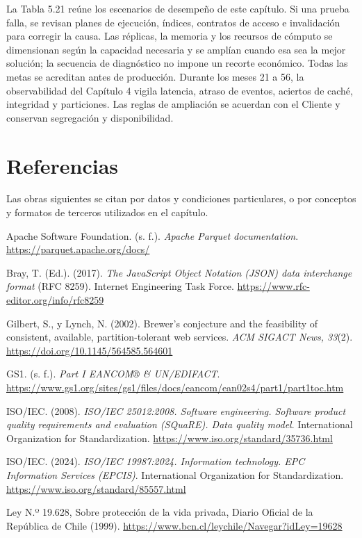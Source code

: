 \documentclass[11pt]{article}
\begin{document}
La Tabla 5.21 reúne los escenarios de desempeño de este capítulo. Si una prueba falla, se revisan planes de ejecución, índices, contratos de acceso e invalidación para corregir la causa. Las réplicas, la memoria y los recursos de cómputo se dimensionan según la capacidad necesaria y se amplían cuando esa sea la mejor solución; la secuencia de diagnóstico no impone un recorte económico. Todas las metas se acreditan antes de producción. Durante los meses 21 a 56, la observabilidad del Capítulo 4 vigila latencia, atraso de eventos, aciertos de caché, integridad y particiones. Las reglas de ampliación se acuerdan con el Cliente y conservan segregación y disponibilidad.


\section*{Referencias}

Las obras siguientes se citan por datos y condiciones particulares, o por conceptos y formatos de terceros utilizados en el capítulo.

Apache Software Foundation. (s. f.). \textit{Apache Parquet documentation}. \url{https://parquet.apache.org/docs/}

Bray, T. (Ed.). (2017). \textit{The JavaScript Object Notation (JSON) data interchange format} (RFC 8259). Internet Engineering Task Force. \url{https://www.rfc-editor.org/info/rfc8259}


Gilbert, S., y Lynch, N. (2002). Brewer's conjecture and the feasibility of consistent, available, partition-tolerant web services. \textit{ACM SIGACT News, 33}(2). \url{https://doi.org/10.1145/564585.564601}

GS1. (s. f.). \textit{Part I EANCOM® \& UN/EDIFACT}. \url{https://www.gs1.org/sites/gs1/files/docs/eancom/ean02s4/part1/part1toc.htm}

ISO/IEC. (2008). \textit{ISO/IEC 25012:2008. Software engineering. Software product quality requirements and evaluation (SQuaRE). Data quality model}. International Organization for Standardization. \url{https://www.iso.org/standard/35736.html}

ISO/IEC. (2024). \textit{ISO/IEC 19987:2024. Information technology. EPC Information Services (EPCIS)}. International Organization for Standardization. \url{https://www.iso.org/standard/85557.html}


Ley N.º 19.628, Sobre protección de la vida privada, Diario Oficial de la República de Chile (1999). \url{https://www.bcn.cl/leychile/Navegar?idLey=19628}
\end{document}

